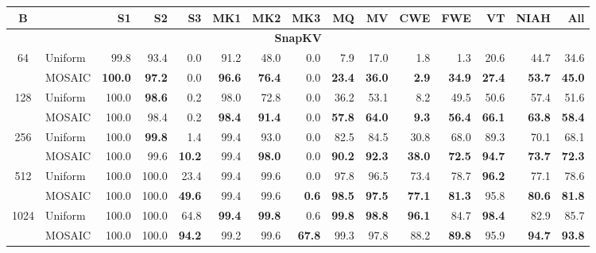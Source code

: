 \begin{table}[tp]
  \centering
  \scriptsize
  \setlength{\tabcolsep}{4pt}
  \renewcommand{\arraystretch}{0.92}
  \begin{tabular}{@{} c l rrrrrrrrrrrrr @{}}
    \toprule
    \textbf{B} & & \textbf{S1} & \textbf{S2} & \textbf{S3} & \textbf{MK1} & \textbf{MK2} & \textbf{MK3} & \textbf{MQ} & \textbf{MV} & \textbf{CWE} & \textbf{FWE} & \textbf{VT} & \textbf{NIAH} & \textbf{All} \\
    \midrule
    \multicolumn{15}{c}{\textbf{SnapKV}} \\
    \midrule
    \multirow{2}{*}{64} & Uniform & 99.8 & 93.4 & 0.0 & 91.2 & 48.0 & 0.0 & 7.9 & 17.0 & 1.8 & 1.3 & 20.6 & 44.7 & 34.6 \\
     & MOSAIC & \textbf{100.0} & \textbf{97.2} & 0.0 & \textbf{96.6} & \textbf{76.4} & 0.0 & \textbf{23.4} & \textbf{36.0} & \textbf{2.9} & \textbf{34.9} & \textbf{27.4} & \textbf{53.7} & \textbf{45.0} \\
    \cmidrule(l){1-15}
    \multirow{2}{*}{128} & Uniform & 100.0 & \textbf{98.6} & 0.2 & 98.0 & 72.8 & 0.0 & 36.2 & 53.1 & 8.2 & 49.5 & 50.6 & 57.4 & 51.6 \\
     & MOSAIC & 100.0 & 98.4 & 0.2 & \textbf{98.4} & \textbf{91.4} & 0.0 & \textbf{57.8} & \textbf{64.0} & \textbf{9.3} & \textbf{56.4} & \textbf{66.1} & \textbf{63.8} & \textbf{58.4} \\
    \cmidrule(l){1-15}
    \multirow{2}{*}{256} & Uniform & 100.0 & \textbf{99.8} & 1.4 & 99.4 & 93.0 & 0.0 & 82.5 & 84.5 & 30.8 & 68.0 & 89.3 & 70.1 & 68.1 \\
     & MOSAIC & 100.0 & 99.6 & \textbf{10.2} & 99.4 & \textbf{98.0} & 0.0 & \textbf{90.2} & \textbf{92.3} & \textbf{38.0} & \textbf{72.5} & \textbf{94.7} & \textbf{73.7} & \textbf{72.3} \\
    \cmidrule(l){1-15}
    \multirow{2}{*}{512} & Uniform & 100.0 & 100.0 & 23.4 & 99.4 & 99.6 & 0.0 & 97.8 & 96.5 & 73.4 & 78.7 & \textbf{96.2} & 77.1 & 78.6 \\
     & MOSAIC & 100.0 & 100.0 & \textbf{49.6} & 99.4 & 99.6 & \textbf{0.6} & \textbf{98.5} & \textbf{97.5} & \textbf{77.1} & \textbf{81.3} & 95.8 & \textbf{80.6} & \textbf{81.8} \\
    \cmidrule(l){1-15}
    \multirow{2}{*}{1024} & Uniform & 100.0 & 100.0 & 64.8 & \textbf{99.4} & \textbf{99.8} & 0.6 & \textbf{99.8} & \textbf{98.8} & \textbf{96.1} & 84.7 & \textbf{98.4} & 82.9 & 85.7 \\
     & MOSAIC & 100.0 & 100.0 & \textbf{94.2} & 99.2 & 99.6 & \textbf{67.8} & 99.3 & 97.8 & 88.2 & \textbf{89.8} & 95.9 & \textbf{94.7} & \textbf{93.8} \\

\end{tabular}
\end{table}
